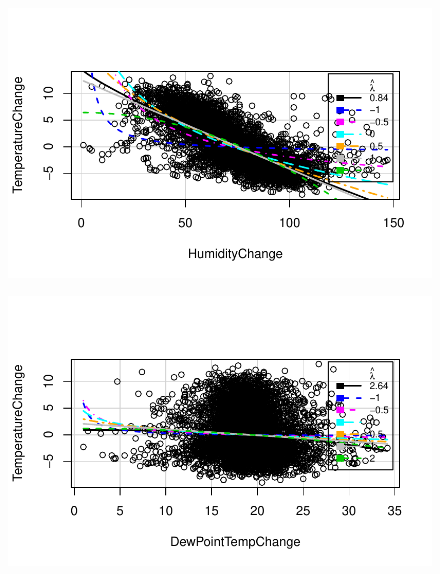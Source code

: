 \documentclass[
  letterpaper,
  DIV=11,
  numbers=noendperiod]{scrartcl}
\begin{document}
\begin{figure}[H]

{\centering \includegraphics{seoul_files/figure-pdf/unnamed-chunk-13-1.pdf}

}

\end{figure}

\begin{figure}[H]

{\centering \includegraphics{seoul_files/figure-pdf/unnamed-chunk-13-2.pdf}

}

\end{figure}
\end{document}
